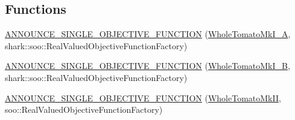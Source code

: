 \subsection*{\-Functions}
\begin{DoxyCompactItemize}
\item 
\hyperlink{namespace_p_r_p_s_evolution_aeb4ff98aa5c64a1428ed3a67640ea6b9}{\-A\-N\-N\-O\-U\-N\-C\-E\-\_\-\-S\-I\-N\-G\-L\-E\-\_\-\-O\-B\-J\-E\-C\-T\-I\-V\-E\-\_\-\-F\-U\-N\-C\-T\-I\-O\-N} (\hyperlink{struct_p_r_p_s_evolution_1_1_whole_tomato_mk_i___a}{\-Whole\-Tomato\-Mk\-I\-\_\-\-A}, shark\-::soo\-::\-Real\-Valued\-Objective\-Function\-Factory)
\item 
\hyperlink{namespace_p_r_p_s_evolution_a543d57eaaf62aa9a49e7444beb22917a}{\-A\-N\-N\-O\-U\-N\-C\-E\-\_\-\-S\-I\-N\-G\-L\-E\-\_\-\-O\-B\-J\-E\-C\-T\-I\-V\-E\-\_\-\-F\-U\-N\-C\-T\-I\-O\-N} (\hyperlink{struct_p_r_p_s_evolution_1_1_whole_tomato_mk_i___b}{\-Whole\-Tomato\-Mk\-I\-\_\-\-B}, shark\-::soo\-::\-Real\-Valued\-Objective\-Function\-Factory)
\item 
\hyperlink{namespace_p_r_p_s_evolution_a9d44d13a091e5e8ae8df898b9535ba67}{\-A\-N\-N\-O\-U\-N\-C\-E\-\_\-\-S\-I\-N\-G\-L\-E\-\_\-\-O\-B\-J\-E\-C\-T\-I\-V\-E\-\_\-\-F\-U\-N\-C\-T\-I\-O\-N} (\hyperlink{struct_p_r_p_s_evolution_1_1_whole_tomato_mk_i_i}{\-Whole\-Tomato\-Mk\-I\-I}, soo\-::\-Real\-Valued\-Objective\-Function\-Factory)
\end{DoxyCompactItemize}
